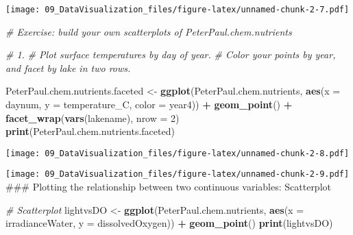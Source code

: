 \documentclass[]{article}
\newenvironment{Shaded}{\begin{snugshade}}{\end{snugshade}}
\newcommand{\KeywordTok}[1]{\textcolor[rgb]{0.13,0.29,0.53}{\textbf{#1}}}
\newcommand{\DataTypeTok}[1]{\textcolor[rgb]{0.13,0.29,0.53}{#1}}
\newcommand{\DecValTok}[1]{\textcolor[rgb]{0.00,0.00,0.81}{#1}}
\newcommand{\FloatTok}[1]{\textcolor[rgb]{0.00,0.00,0.81}{#1}}
\newcommand{\StringTok}[1]{\textcolor[rgb]{0.31,0.60,0.02}{#1}}
\newcommand{\CommentTok}[1]{\textcolor[rgb]{0.56,0.35,0.01}{\textit{#1}}}
\newcommand{\OperatorTok}[1]{\textcolor[rgb]{0.81,0.36,0.00}{\textbf{#1}}}
\newcommand{\NormalTok}[1]{#1}
\begin{document}
\texttt{[image: 09\_DataVisualization\_files/figure-latex/unnamed-chunk-2-7.pdf]}

\begin{Shaded}
\begin{Highlighting}[]
\CommentTok{# Exercise: build your own scatterplots of PeterPaul.chem.nutrients}

\CommentTok{# 1. }
\CommentTok{# Plot surface temperatures by day of  year. }
\CommentTok{# Color your points by year, and facet by lake in two rows.}

\NormalTok{PeterPaul.chem.nutrients.faceted <-}
\StringTok{  }\KeywordTok{ggplot}\NormalTok{(PeterPaul.chem.nutrients, }\KeywordTok{aes}\NormalTok{(}\DataTypeTok{x =}\NormalTok{ daynum, }\DataTypeTok{y =}\NormalTok{ temperature_C, }\DataTypeTok{color =}\NormalTok{ year4)) }\OperatorTok{+}
\StringTok{  }\KeywordTok{geom_point}\NormalTok{() }\OperatorTok{+}
\StringTok{  }\KeywordTok{facet_wrap}\NormalTok{(}\KeywordTok{vars}\NormalTok{(lakename), }\DataTypeTok{nrow =} \DecValTok{2}\NormalTok{) }
\KeywordTok{print}\NormalTok{(PeterPaul.chem.nutrients.faceted)}
\end{Highlighting}
\end{Shaded}

\texttt{[image: 09\_DataVisualization\_files/figure-latex/unnamed-chunk-2-8.pdf]}

\begin{Shaded}
\end{Shaded}

\texttt{[image: 09\_DataVisualization\_files/figure-latex/unnamed-chunk-2-9.pdf]}
\#\#\# Plotting the relationship between two continuous variables:
Scatterplot

\begin{Shaded}
\begin{Highlighting}[]
\CommentTok{# Scatterplot}
\NormalTok{lightvsDO <-}\StringTok{ }
\StringTok{  }\KeywordTok{ggplot}\NormalTok{(PeterPaul.chem.nutrients, }\KeywordTok{aes}\NormalTok{(}\DataTypeTok{x =}\NormalTok{ irradianceWater, }\DataTypeTok{y =}\NormalTok{ dissolvedOxygen)) }\OperatorTok{+}
\StringTok{  }\KeywordTok{geom_point}\NormalTok{()}
\KeywordTok{print}\NormalTok{(lightvsDO)}
\end{Highlighting}
\end{Shaded}
\end{document}
